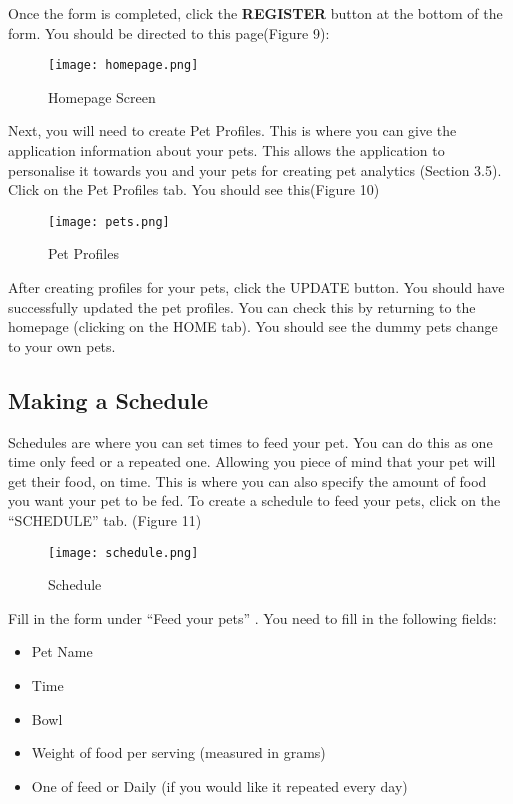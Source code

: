     Once the form is completed, click the \textbf{REGISTER} button at the bottom of the form. You should be directed to this page(Figure 9):
    
     \begin{figure}
        \centering
        \texttt{[image: homepage.png]}
         \caption{Homepage Screen}
        \end{figure}
    
    Next, you will need to create Pet Profiles. This is where you can give the application information about your pets. This allows the application to personalise it towards you and your pets for creating pet analytics (Section 3.5). Click on the Pet Profiles tab. You should see this(Figure 10)
    
    \begin{figure}
        \centering
        \texttt{[image: pets.png]}
         \caption{Pet Profiles}
        \end{figure}
    
    After creating profiles for your pets, click the UPDATE  button. You should have successfully updated the pet profiles. You can check this by returning to the homepage (clicking on the HOME tab). You should see the dummy pets change to your own pets. 


\subsection{Making a Schedule}
Schedules are where you can set times to feed your pet. You can do this as one time only feed or a repeated one. Allowing you piece of mind that your pet will get their food, on time. This is where you can also specify the amount of food you want your pet to be fed. To create a schedule to feed your pets, click on the “SCHEDULE” tab. (Figure 11)

 \begin{figure}
        \centering
        \texttt{[image: schedule.png]}
         \caption{Schedule}
        \end{figure}

Fill in the form under “Feed your pets” . You need to fill in the following fields:
\begin{itemize}
\item Pet Name 
\item Time 
\item Bowl
\item Weight of food per serving (measured in grams)
\item One of feed or Daily (if you would like it repeated every day)
\end{itemize}

